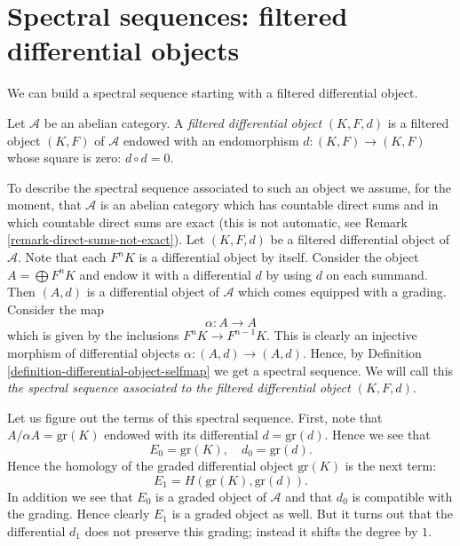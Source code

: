 \section{Spectral sequences: filtered differential objects}
\label{section-filtered-differential}

\noindent
We can build a spectral sequence starting with a filtered
differential object.

\begin{definition}
\label{definition-filtered-differential}
Let $\mathcal{A}$ be an abelian category.
A {\it filtered differential object} $(K, F, d)$ is a filtered object
$(K, F)$ of $\mathcal{A}$ endowed with an endomorphism
$d : (K, F) \to (K, F)$ whose square is zero: $d \circ d = 0$.
\end{definition}

\noindent
To describe the spectral sequence associated to such an object
we assume, for the moment, that $\mathcal{A}$ is an abelian category
which has countable direct sums and in which countable direct sums are exact
(this is not automatic, see Remark \ref{remark-direct-sums-not-exact}).
Let $(K, F, d)$ be a filtered differential object of $\mathcal{A}$.
Note that each $F^nK$ is a differential object by itself.
Consider the object $A = \bigoplus F^nK$ and endow it with a
differential $d$ by using $d$ on each summand.
Then $(A, d)$ is a differential object of $\mathcal{A}$
which comes equipped with a grading. Consider the map
$$
\alpha : A \to A
$$
which is given by the inclusions $F^nK \to F^{n - 1}K$.
This is clearly an injective morphism of differential objects
$\alpha : (A, d) \to (A, d)$. Hence, by
Definition \ref{definition-differential-object-selfmap}
we get a spectral sequence.
We will call this {\it the spectral sequence associated to
the filtered differential object $(K, F, d)$}.

\medskip\noindent
Let us figure out the terms of this spectral sequence.
First, note that $A/\alpha A = \text{gr}(K)$
endowed with its differential $d = \text{gr}(d)$. Hence we see that
$$
E_0 = \text{gr}(K), \quad d_0 = \text{gr}(d).
$$
Hence the homology of the graded differential object $\text{gr}(K)$
is the next term:
$$
E_1 = H(\text{gr}(K), \text{gr}(d)).
$$
In addition we see that $E_0$ is a graded object of $\mathcal{A}$
and that $d_0$ is compatible with the grading. Hence clearly $E_1$
is a graded object as well. But it turns out that the differential
$d_1$ does not preserve this grading; instead it shifts the degree by $1$.

